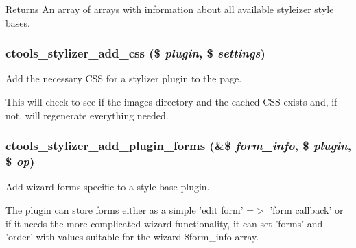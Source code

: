 \begin{DoxyReturn}{Returns}
An array of arrays with information about all available styleizer style bases. 
\end{DoxyReturn}
\hypertarget{includes_2stylizer_8inc_a35692d99bf23f2c31521807f0b197c6c}{
\subsubsection[{ctools\_\-stylizer\_\-add\_\-css}]{\setlength{\rightskip}{0pt plus 5cm}ctools\_\-stylizer\_\-add\_\-css (\$ {\em plugin}, \/  \$ {\em settings})}}
\label{includes_2stylizer_8inc_a35692d99bf23f2c31521807f0b197c6c}
Add the necessary CSS for a stylizer plugin to the page.

This will check to see if the images directory and the cached CSS exists and, if not, will regenerate everything needed. \hypertarget{includes_2stylizer_8inc_a88a387dceced85748501cc732527a6d7}{
\subsubsection[{ctools\_\-stylizer\_\-add\_\-plugin\_\-forms}]{\setlength{\rightskip}{0pt plus 5cm}ctools\_\-stylizer\_\-add\_\-plugin\_\-forms (\&\$ {\em form\_\-info}, \/  \$ {\em plugin}, \/  \$ {\em op})}}
\label{includes_2stylizer_8inc_a88a387dceced85748501cc732527a6d7}
Add wizard forms specific to a style base plugin.

The plugin can store forms either as a simple 'edit form' =$>$ 'form callback' or if it needs the more complicated wizard functionality, it can set 'forms' and 'order' with values suitable for the wizard \$form\_\-info array.


